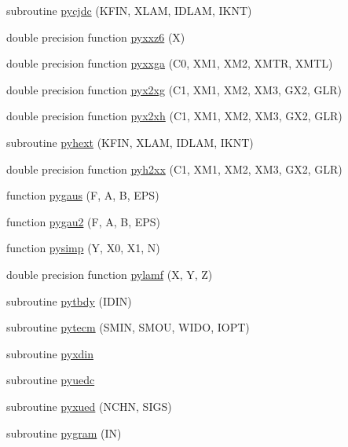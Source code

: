\begin{DoxyCompactItemize}
subroutine \hyperlink{pythia-6_84_824_8f_ad5dbd98640d6b5751ae21c8467d25142}{pycjdc} (K\+F\+IN, X\+L\+AM, I\+D\+L\+AM, I\+K\+NT)
\item 
double precision function \hyperlink{pythia-6_84_824_8f_ad3802fc93d4a590b18e75cf9ffc0c04c}{pyxxz6} (X)
\item 
double precision function \hyperlink{pythia-6_84_824_8f_aa378166597fcb20d89584665eaf754c5}{pyxxga} (C0, X\+M1, X\+M2, X\+M\+TR, X\+M\+TL)
\item 
double precision function \hyperlink{pythia-6_84_824_8f_a628cca4ef6ca74365a47cbb6aec90a5f}{pyx2xg} (C1, X\+M1, X\+M2, X\+M3, G\+X2, G\+LR)
\item 
double precision function \hyperlink{pythia-6_84_824_8f_a172c02bb050da4b11542b15cb94e94f2}{pyx2xh} (C1, X\+M1, X\+M2, X\+M3, G\+X2, G\+LR)
\item 
subroutine \hyperlink{pythia-6_84_824_8f_a22a3f7a152bcf344f26ebfe59ee78151}{pyhext} (K\+F\+IN, X\+L\+AM, I\+D\+L\+AM, I\+K\+NT)
\item 
double precision function \hyperlink{pythia-6_84_824_8f_a77dc3ade154146159f6da8352bc4edf6}{pyh2xx} (C1, X\+M1, X\+M2, X\+M3, G\+X2, G\+LR)
\item 
function \hyperlink{pythia-6_84_824_8f_a54737ed1fa8203d34f6b7e41f8edaf45}{pygaus} (F, A, B, E\+PS)
\item 
function \hyperlink{pythia-6_84_824_8f_ad2bff8fc5a17d91922af88f41b6e22f3}{pygau2} (F, A, B, E\+PS)
\item 
function \hyperlink{pythia-6_84_824_8f_a743f71aa398768156c651708fff83733}{pysimp} (Y, X0, X1, N)
\item 
double precision function \hyperlink{pythia-6_84_824_8f_a9a5e0b1d8e92be18ecc53d89aba71c09}{pylamf} (X, Y, Z)
\item 
subroutine \hyperlink{pythia-6_84_824_8f_a89821a60f56d9d359eb0d345f14611f4}{pytbdy} (I\+D\+IN)
\item 
subroutine \hyperlink{pythia-6_84_824_8f_a704cb09d423c8653c6bdd905afbaa35f}{pytecm} (S\+M\+IN, S\+M\+OU, W\+I\+DO, I\+O\+PT)
\item 
subroutine \hyperlink{pythia-6_84_824_8f_ab95e134e2b1bd1f755046578bf681217}{pyxdin}
\item 
subroutine \hyperlink{pythia-6_84_824_8f_ad4589c4d52b9eb7dbb722acc463b8ceb}{pyuedc}
\item 
subroutine \hyperlink{pythia-6_84_824_8f_a6934d9dda7d346e7f4173dcf9566e12d}{pyxued} (N\+C\+HN, S\+I\+GS)
\item 
subroutine \hyperlink{pythia-6_84_824_8f_a248b5187a6bf187f6d5daff60b824804}{pygram} (IN)

\end{DoxyCompactItemize}
